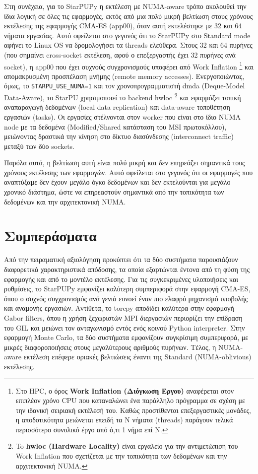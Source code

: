 Στη συνέχεια, για το StarPUPy η εκτέλεση με NUMA-aware τρόπο ακολουθεί την ίδια λογική σε όλες τις εφαρμογές, εκτός από μια πολύ μικρή βελτίωση στους χρόνους εκτέλεσης της εφαρμογής CMA-ES (app00), όταν αυτή εκτελέστηκε με 32 και 64 νήματα εργασίας. Αυτό οφείλεται στο γεγονός ότι το StarPUPy στο Standard mode αφήνει το Linux OS να δρομολογήσει τα threads ελεύθερα. Στους 32 και 64 πυρήνες (που σημαίνει cross-socket εκτέλεση, αφού ο επεξεργαστής έχει 32 πυρήνες ανά socket), η app00 που έχει συχνούς συγχρονισμούς υποφέρει από Work Inflation \footnote{Στο HPC, ο όρος \textbf{Work Inflation (Διόγκωση Έργου)} αναφέρεται στον επιπλέον χρόνο CPU που καταναλώνει ένα παράλληλο πρόγραμμα σε σχέση με την ιδανική σειριακή εκτέλεσή του. Καθώς προστίθενται επεξεργαστικές μονάδες, η αποδοτικότητα μειώνεται επειδή τα N νήματα (threads) παράγουν τελικά περισσότερο συνολικό έργο από ό,τι 1 νήμα επί N.} και απομακρυσμένη προσπέλαση μνήμης (remote memory accesses). Ενεργοποιώντας, όμως, το \texttt{STARPU\_USE\_NUMA=1} και τον χρονοπρογραμματιστή dmda (Deque-Model Data-Aware), το StarPU χρησιμοποιεί το backend hwloc \footnote{To \textbf{hwloc (Hardware Locality)} είναι εργαλείο για την αντιμετώπιση του Work Inflation που σχετίζεται με την τοπικότητα των δεδομένων και την αρχιτεκτονική NUMA.} και εφαρμόζει τοπική αναπαραγωγή δεδομένων (local data replication) και data-aware τοποθέτηση εργασιών (tasks). Οι εργασίες στέλνονται στον worker που είναι στο ίδιο NUMA node με τα δεδομένα (Modified/Shared κατάσταση του MSI πρωτοκόλλου), μειώνοντας δραστικά την κίνηση στο δίκτυο διασύνδεσης (interconnect traffic) μεταξύ των δύο sockets.

Παρόλα αυτά, η βελτίωση αυτή είναι πολύ μικρή και δεν επηρεάζει σημαντικά τους χρόνους εκτέλεσης των εφαρμογών. Αυτό οφείλεται στο γεγονός ότι οι εφαρμογές που αναπτύξαμε δεν έχουν μεγάλο όγκο δεδομένων και δεν εκτελούνται για μεγάλο χρονικό διάστημα, ώστε να επηρεαστούν σημαντικά από την τοπικότητα των δεδομένων και την αρχιτεκτονική NUMA.

\section{Συμπεράσματα}

Από την πειραματική αξιολόγηση προκύπτει ότι τα δύο συστήματα παρουσιάζουν διαφορετικά χαρακτηριστικά απόδοσης, τα οποία εξαρτώνται έντονα από τη φύση της εφαρμογής και από το μοντέλο εκτέλεσης. Για τις συγκεκριμένες υλοποιήσεις και ρυθμίσεις, το StarPUPy εμφανίζει καλύτερη συμπεριφορά στην εφαρμογή CMA-ES, όπου ο συχνός συγχρονισμός ανά γενιά ευνοεί έναν πιο ελαφρύ μηχανισμό υποβολής και αναμονής εργασιών. Αντίθετα, το torcpy αποδίδει καλύτερα στην εφαρμογή Gabor filters, όπου η χρήση ξεχωριστών MPI διεργασιών περιορίζει την επίδραση του GIL και μειώνει τον ανταγωνισμό εντός ενός κοινού Python interpreter. Στην εφαρμογή Monte Carlo, τα δύο συστήματα εμφανίζουν συγκρίσιμη συμπεριφορά, με μικρές διαφοροποιήσεις στους μεγαλύτερους αριθμούς πυρήνων. Τέλος, η NUMA-aware εκτέλεση επέφερε οριακές βελτιώσεις έναντι της Standard (NUMA-oblivious) εκτέλεσης. 

